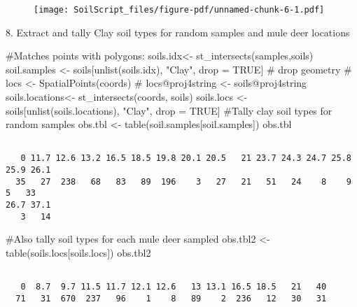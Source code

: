\documentclass[
  letterpaper,
]{book}
\newenvironment{Shaded}{\begin{snugshade}}{\end{snugshade}}
\newcommand{\CommentTok}[1]{\textcolor[rgb]{0.37,0.37,0.37}{#1}}
\newcommand{\ConstantTok}[1]{\textcolor[rgb]{0.56,0.35,0.01}{#1}}
\newcommand{\FunctionTok}[1]{\textcolor[rgb]{0.28,0.35,0.67}{#1}}
\newcommand{\NormalTok}[1]{\textcolor[rgb]{0.00,0.23,0.31}{#1}}
\newcommand{\OtherTok}[1]{\textcolor[rgb]{0.00,0.23,0.31}{#1}}
\newcommand{\StringTok}[1]{\textcolor[rgb]{0.13,0.47,0.30}{#1}}
\begin{document}
\begin{figure}[H]

{\centering \texttt{[image: SoilScript\_files/figure-pdf/unnamed-chunk-6-1.pdf]}

}

\end{figure}

8. Extract and tally Clay soil types for random samples and mule deer
locations

\begin{Shaded}
\begin{Highlighting}[]
\CommentTok{\#Matches points with polygons:}
\NormalTok{soils.idx}\OtherTok{\textless{}{-}} \FunctionTok{st\_intersects}\NormalTok{(samples,soils)}
\NormalTok{soil.samples }\OtherTok{\textless{}{-}}\NormalTok{ soils[}\FunctionTok{unlist}\NormalTok{(soils.idx), }\StringTok{"Clay"}\NormalTok{, drop }\OtherTok{=} \ConstantTok{TRUE}\NormalTok{] }\CommentTok{\# drop geometry}
\CommentTok{\# locs \textless{}{-} SpatialPoints(coords)}
\CommentTok{\# locs@proj4string \textless{}{-} soils@proj4string}
\NormalTok{soils.locations}\OtherTok{\textless{}{-}} \FunctionTok{st\_intersects}\NormalTok{(coords, soils)}
\NormalTok{soils.locs }\OtherTok{\textless{}{-}}\NormalTok{ soils[}\FunctionTok{unlist}\NormalTok{(soils.locations), }\StringTok{"Clay"}\NormalTok{, drop }\OtherTok{=} \ConstantTok{TRUE}\NormalTok{]}
\CommentTok{\#Tally clay soil types for random samples}
\NormalTok{obs.tbl }\OtherTok{\textless{}{-}} \FunctionTok{table}\NormalTok{(soil.samples[soil.samples])}
\NormalTok{obs.tbl}
\end{Highlighting}
\end{Shaded}

\begin{verbatim}

   0 11.7 12.6 13.2 16.5 18.5 19.8 20.1 20.5   21 23.7 24.3 24.7 25.8 25.9 26.1 
  35   27  238   68   83   89  196    3   27   21   51   24    8    9    5   33 
26.7 37.1 
   3   14 
\end{verbatim}

\begin{Shaded}
\begin{Highlighting}[]
\CommentTok{\#Also tally soil types for each mule deer sampled}
\NormalTok{obs.tbl2 }\OtherTok{\textless{}{-}} \FunctionTok{table}\NormalTok{(soils.locs[soils.locs])}
\NormalTok{obs.tbl2}
\end{Highlighting}
\end{Shaded}

\begin{verbatim}

   0  8.7  9.7 11.5 11.7 12.1 12.6   13 13.1 16.5 18.5   21   40 
  71   31  670  237   96    1    8   89    2  236   12   30   31 
\end{verbatim}
\end{document}
